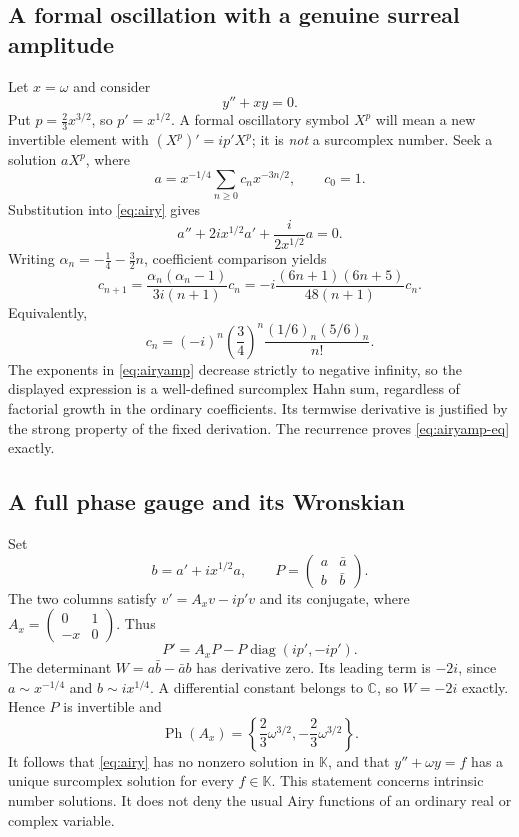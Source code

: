 \documentclass[11pt,a4paper]{article}
\numberwithin{equation}{section}
\theoremstyle{definition}
\theoremstyle{remark}
\newcommand{\K}{\mathbb K}
\newcommand{\C}{\mathbb C}
\newcommand{\diag}{\operatorname{diag}}
\newcommand{\Specph}{\operatorname{Ph}}
\begin{document}
\subsection{A formal oscillation with a genuine surreal amplitude}
Let $x=\omega$ and consider
\begin{equation}\label{eq:airy}
 y''+xy=0.
\end{equation}
Put $p=\tfrac23 x^{3/2}$, so $p'=x^{1/2}$. A formal oscillatory symbol
$X^p$ will mean a new invertible element with
$(X^p)'=ip'X^p$; it is \emph{not} a surcomplex number. Seek a solution
$aX^p$, where
\begin{equation}\label{eq:airyamp}
 a=x^{-1/4}\sum_{n\ge0}c_nx^{-3n/2},\qquad c_0=1.
\end{equation}
Substitution into \eqref{eq:airy} gives
\begin{equation}\label{eq:airyamp-eq}
 a''+2ix^{1/2}a'+\frac{i}{2x^{1/2}}a=0.
\end{equation}
Writing $\alpha_n=-\tfrac14-\tfrac32n$, coefficient comparison yields
\begin{equation}\label{eq:airyrec}
 c_{n+1}=\frac{\alpha_n(\alpha_n-1)}{3i(n+1)}c_n
       =-i\frac{(6n+1)(6n+5)}{48(n+1)}c_n.
\end{equation}
Equivalently,
\[
 c_n=(-i)^n\left(\frac34\right)^n
          \frac{(1/6)_n(5/6)_n}{n!}.
\]
The exponents in \eqref{eq:airyamp} decrease strictly to negative infinity,
so the displayed expression is a well-defined surcomplex Hahn sum,
regardless of factorial growth in the ordinary coefficients. Its termwise
derivative is justified by the strong property of the fixed derivation.
The recurrence proves \eqref{eq:airyamp-eq} exactly.

\subsection{A full phase gauge and its Wronskian}
Set
\[
 b=a'+ix^{1/2}a,\qquad
 P=\begin{pmatrix}a&\bar a\\b&\bar b\end{pmatrix}.
\]
The two columns satisfy $v'=A_xv-ip'v$ and its conjugate, where
$A_x=\left(\begin{smallmatrix}0&1\\-x&0\end{smallmatrix}\right)$. Thus
\[
 P'=A_xP-P\diag(ip',-ip').
\]
The determinant $W=a\bar b-\bar a b$ has derivative zero. Its leading term
is $-2i$, since $a\sim x^{-1/4}$ and $b\sim ix^{1/4}$. A differential
constant belongs to $\C$, so $W=-2i$ exactly. Hence $P$ is invertible and
\begin{equation}\label{eq:airyphases}
 \Specph(A_x)=\left\{\frac23\omega^{3/2},-\frac23\omega^{3/2}\right\}.
\end{equation}
It follows that \eqref{eq:airy} has no nonzero solution in $\K$, and that
$y''+\omega y=f$ has a unique surcomplex solution for every $f\in\K$.
This statement concerns intrinsic number solutions. It does not deny the
usual Airy functions of an ordinary real or complex variable.
\end{document}
